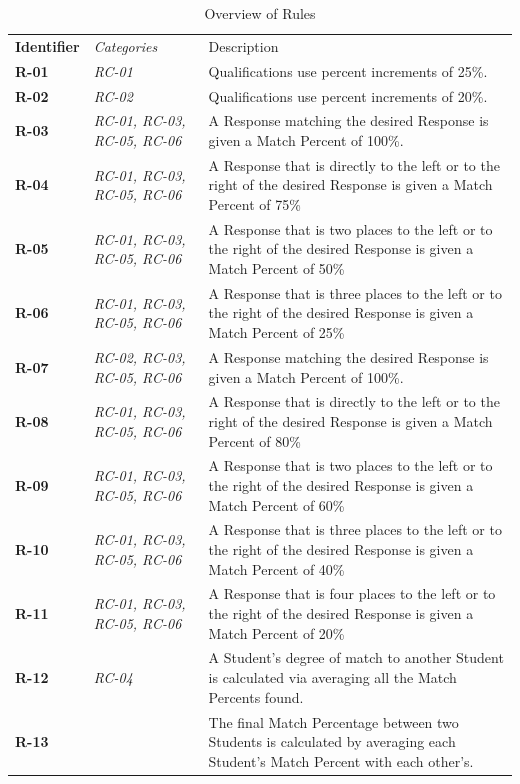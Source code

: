 \documentclass[12pt,letterpaper]{article}
\begin{document}
\begin{table}[H]
	\caption{Overview of Rules}
	\begin{tabu} to 
	    \tableheader{}Identifier & Categories & Description\\
		R-01 & RC-01 & Qualifications use percent increments of 25\%.\\
		R-02 & RC-02 & Qualifications use percent increments of 20\%.\\
		R-03 & RC-01, RC-03, RC-05, RC-06 & A Response matching the desired Response is given a Match Percent of 100\%.\\
		R-04 & RC-01, RC-03, RC-05, RC-06 & A Response that is directly to the left or to the right of the desired Response is given a Match Percent of 75\%\\
		R-05 & RC-01, RC-03, RC-05, RC-06 & A Response that is two places to the left or to the right of the desired Response is given a Match Percent of 50\%\\
		R-06 & RC-01, RC-03, RC-05, RC-06 & A Response that is three places to the left or to the right of the desired Response is given a Match Percent of 25\%\\
		R-07 & RC-02, RC-03, RC-05, RC-06 & A Response matching the desired Response is given a Match Percent of 100\%.\\
		R-08 & RC-01, RC-03, RC-05, RC-06 & A Response that is directly to the left or to the right of the desired Response is given a Match Percent of 80\%\\
		R-09 & RC-01, RC-03, RC-05, RC-06 & A Response that is two places to the left or to the right of the desired Response is given a Match Percent of 60\%\\
		R-10 & RC-01, RC-03, RC-05, RC-06 & A Response that is three places to the left or to the right of the desired Response is given a Match Percent of 40\%\\
		R-11 & RC-01, RC-03, RC-05, RC-06 & A Response that is four places to the left or to the right of the desired Response is given a Match Percent of 20\%\\
		R-12 & RC-04 & A Student's degree of match to another Student is calculated via averaging all the Match Percents found. \\
		R-13 & & The final Match Percentage between two Students is calculated by averaging each Student's Match Percent with each other's.\\
	\end{tabu}
\end{table}
\end{document}
